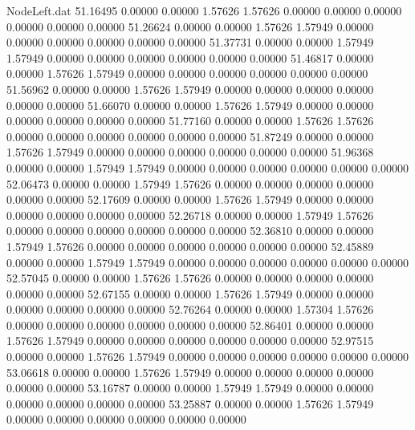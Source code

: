 \begin{filecontents}{NodeLeft.dat}
  51.16495    0.00000    0.00000     1.57626    1.57626    0.00000    0.00000    0.00000    0.00000    0.00000    0.00000
  51.26624    0.00000    0.00000     1.57626    1.57949    0.00000    0.00000    0.00000    0.00000    0.00000    0.00000
  51.37731    0.00000    0.00000     1.57949    1.57949    0.00000    0.00000    0.00000    0.00000    0.00000    0.00000
  51.46817    0.00000    0.00000     1.57626    1.57949    0.00000    0.00000    0.00000    0.00000    0.00000    0.00000
  51.56962    0.00000    0.00000     1.57626    1.57949    0.00000    0.00000    0.00000    0.00000    0.00000    0.00000
  51.66070    0.00000    0.00000     1.57626    1.57949    0.00000    0.00000    0.00000    0.00000    0.00000    0.00000
  51.77160    0.00000    0.00000     1.57626    1.57626    0.00000    0.00000    0.00000    0.00000    0.00000    0.00000
  51.87249    0.00000    0.00000     1.57626    1.57949    0.00000    0.00000    0.00000    0.00000    0.00000    0.00000
  51.96368    0.00000    0.00000     1.57949    1.57949    0.00000    0.00000    0.00000    0.00000    0.00000    0.00000
  52.06473    0.00000    0.00000     1.57949    1.57626    0.00000    0.00000    0.00000    0.00000    0.00000    0.00000
  52.17609    0.00000    0.00000     1.57626    1.57949    0.00000    0.00000    0.00000    0.00000    0.00000    0.00000
  52.26718    0.00000    0.00000     1.57949    1.57626    0.00000    0.00000    0.00000    0.00000    0.00000    0.00000
  52.36810    0.00000    0.00000     1.57949    1.57626    0.00000    0.00000    0.00000    0.00000    0.00000    0.00000
  52.45889    0.00000    0.00000     1.57949    1.57949    0.00000    0.00000    0.00000    0.00000    0.00000    0.00000
  52.57045    0.00000    0.00000     1.57626    1.57626    0.00000    0.00000    0.00000    0.00000    0.00000    0.00000
  52.67155    0.00000    0.00000     1.57626    1.57949    0.00000    0.00000    0.00000    0.00000    0.00000    0.00000
  52.76264    0.00000    0.00000     1.57304    1.57626    0.00000    0.00000    0.00000    0.00000    0.00000    0.00000
  52.86401    0.00000    0.00000     1.57626    1.57949    0.00000    0.00000    0.00000    0.00000    0.00000    0.00000
  52.97515    0.00000    0.00000     1.57626    1.57949    0.00000    0.00000    0.00000    0.00000    0.00000    0.00000
  53.06618    0.00000    0.00000     1.57626    1.57949    0.00000    0.00000    0.00000    0.00000    0.00000    0.00000
  53.16787    0.00000    0.00000     1.57949    1.57949    0.00000    0.00000    0.00000    0.00000    0.00000    0.00000
  53.25887    0.00000    0.00000     1.57626    1.57949    0.00000    0.00000    0.00000    0.00000    0.00000    0.00000

\end{filecontents}
